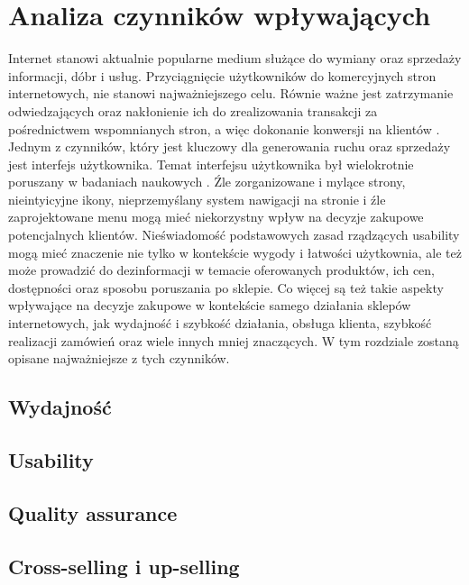 \section{Analiza czynników wpływających}
\indent \indent Internet stanowi aktualnie popularne medium służące do wymiany 
oraz sprzedaży informacji, dóbr i usług. 
Przyciągnięcie użytkowników do komercyjnych stron internetowych, nie stanowi 
najważniejszego celu.
Równie ważne jest zatrzymanie odwiedzających oraz nakłonienie ich do zrealizowania 
transakcji za pośrednictwem wspomnianych stron, a więc dokonanie konwersji na 
klientów \cite{helander}\myfoot[helander].
Jednym z czynników, który jest kluczowy dla generowania ruchu oraz sprzedaży jest 
interfejs użytkownika. Temat interfejsu użytkownika był wielokrotnie poruszany 
w badaniach naukowych \cite{spiller, bellman, keeney, yoo, kim}
\myfoot[spiller]\myfoot[bellman]\myfoot[keeney]\myfoot[yoo]\myfoot[bellman].
Źle zorganizowane i mylące strony, nieintyicyjne ikony, nieprzemyślany system 
nawigacji na stronie i źle zaprojektowane menu mogą mieć niekorzystny wpływ na 
decyzje zakupowe potencjalnych klientów.
Nieświadomość podstawowych zasad rządzących usability mogą mieć znaczenie nie 
tylko w kontekście wygody i łatwości użytkownia, ale też może prowadzić do 
dezinformacji w temacie oferowanych produktów, ich cen, dostępności oraz 
sposobu poruszania po sklepie.
Co więcej są też takie aspekty wpływające na decyzje zakupowe w kontekście 
samego działania sklepów internetowych, jak wydajność i szybkość działania, 
obsługa klienta, szybkość realizacji zamówień oraz wiele innych mniej znaczących. 
W tym rozdziale zostaną opisane najważniejsze z tych czynników.

\subsection{Wydajność}

\subsection{Usability}

\subsection{Quality assurance}

\subsection{Cross-selling i up-selling}

\newpage
